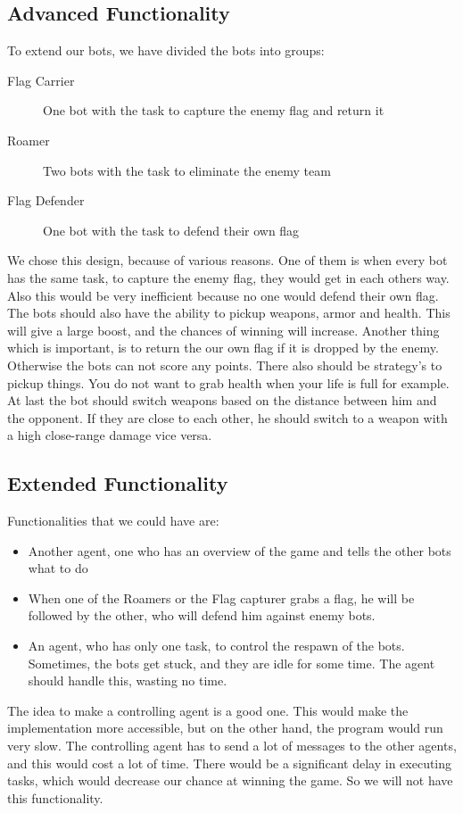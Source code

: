 \subsection{Advanced Functionality}
To extend our bots, we have divided the bots into groups:
\begin{description}
	\item[Flag Carrier] One bot with the task to capture the enemy flag and return it
	\item[Roamer] Two bots with the task to eliminate the enemy team
	\item[Flag Defender] One bot with the task to defend their own flag 
\end{description}
We chose this design, because of various reasons. One of them is when every bot has the same task, to capture the enemy flag, they would get in each others way. Also this would be very inefficient because no one would defend their own flag. The bots should also have the ability to pickup weapons, armor and health. This will give a large boost, and the chances of winning will increase. Another thing which is important, is to return the our own flag if it is dropped by the enemy. Otherwise the bots can not score any points. There also should be strategy's to pickup things. You do not want to grab health when your life is full for example. At last the bot should switch weapons based on the distance between him and the opponent. If they are close to each other, he should switch to a weapon with a high close-range damage vice versa.\\

\subsection{Extended Functionality}
Functionalities that we could have are:
\begin{itemize}
	\item Another agent, one who has an overview of the game and tells the other bots what to do
	\item When one of the Roamers or the Flag capturer grabs a flag, he will be followed by the other, who will defend him against enemy bots.
	\item An agent, who has only one task, to control the respawn of the bots. Sometimes, the bots get stuck, and they are idle for some time. The agent should handle this, wasting no time.
\end{itemize}
The idea to make a controlling agent is a good one. This would make the implementation more accessible, but on the other hand, the program would run very slow. The controlling agent has to send a lot of messages to the other agents, and this would cost a lot of time. There would be a significant delay in executing tasks, which would decrease our chance at winning the game. So we will not have this functionality.\\


